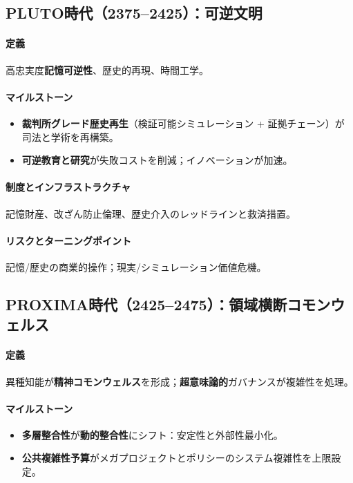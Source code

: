 \documentclass[11pt]{article}
\begin{document}
\subsection{PLUTO時代（2375–2425）：可逆文明}
\paragraph{定義} 高忠実度\textbf{記憶可逆性}、歴史的再現、時間工学。

\paragraph{マイルストーン}
\begin{itemize}[noitemsep]
  \item \textbf{裁判所グレード歴史再生}（検証可能シミュレーション + 証拠チェーン）が司法と学術を再構築。
  \item \textbf{可逆教育と研究}が失敗コストを削減；イノベーションが加速。
\end{itemize}

\paragraph{制度とインフラストラクチャ} 記憶財産、改ざん防止倫理、歴史介入のレッドラインと救済措置。

\paragraph{リスクとターニングポイント} 記憶/歴史の商業的操作；現実/シミュレーション価値危機。

\subsection{PROXIMA時代（2425–2475）：領域横断コモンウェルス}
\paragraph{定義} 異種知能が\textbf{精神コモンウェルス}を形成；\textbf{超意味論的}ガバナンスが複雑性を処理。

\paragraph{マイルストーン}
\begin{itemize}[noitemsep]
  \item \textbf{多層整合性}が\textbf{動的整合性}にシフト：安定性と外部性最小化。
  \item \textbf{公共複雑性予算}がメガプロジェクトとポリシーのシステム複雑性を上限設定。
\end{itemize}
\end{document}
